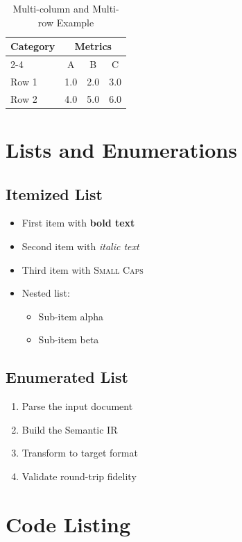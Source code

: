 \documentclass[conference]{IEEEtran}
\begin{document}
\begin{table}[htbp]
    \caption{Multi-column and Multi-row Example}
    \centering
    \begin{tabular}{|l|c|c|c|}
        \hline
        \multirow{2}{*}{\textbf{Category}} & \multicolumn{3}{c|}{\textbf{Metrics}} \\
        \cline{2-4}
        & A & B & C \\
        \hline
        Row 1 & 1.0 & 2.0 & 3.0 \\
        Row 2 & 4.0 & 5.0 & 6.0 \\
        \hline
    \end{tabular}
\end{table}

\section{Lists and Enumerations}

\subsection{Itemized List}
\begin{itemize}
    \item First item with \textbf{bold text}
    \item Second item with \textit{italic text}
    \item Third item with \textsc{Small Caps}
    \item Nested list:
    \begin{itemize}
        \item Sub-item alpha
        \item Sub-item beta
    \end{itemize}
\end{itemize}

\subsection{Enumerated List}
\begin{enumerate}
    \item Parse the input document
    \item Build the Semantic IR
    \item Transform to target format
    \item Validate round-trip fidelity
\end{enumerate}

\section{Code Listing}
\end{document}
